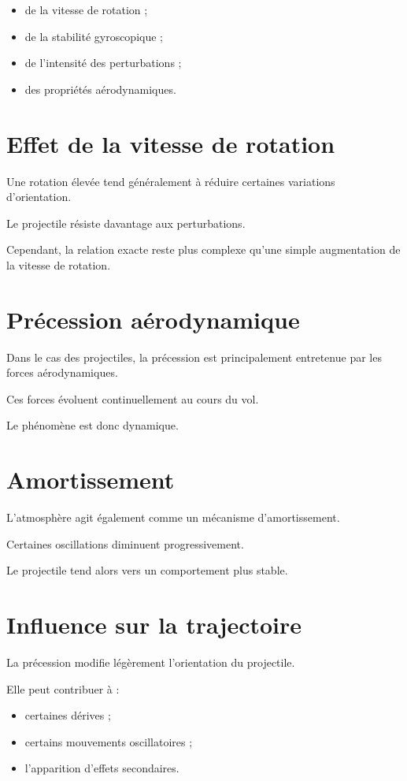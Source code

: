 \begin{itemize}
    \item de la vitesse de rotation ;
    \item de la stabilité gyroscopique ;
    \item de l'intensité des perturbations ;
    \item des propriétés aérodynamiques.
\end{itemize}

\section{Effet de la vitesse de rotation}

Une rotation élevée tend généralement à réduire certaines variations
d'orientation.

Le projectile résiste davantage aux perturbations.

Cependant, la relation exacte reste plus complexe qu'une simple augmentation
de la vitesse de rotation.

\section{Précession aérodynamique}

Dans le cas des projectiles, la précession est principalement entretenue par
les forces aérodynamiques.

Ces forces évoluent continuellement au cours du vol.

Le phénomène est donc dynamique.

\section{Amortissement}

L'atmosphère agit également comme un mécanisme d'amortissement.

Certaines oscillations diminuent progressivement.

Le projectile tend alors vers un comportement plus stable.

\section{Influence sur la trajectoire}

La précession modifie légèrement l'orientation du projectile.

Elle peut contribuer à :

\begin{itemize}
    \item certaines dérives ;
    \item certains mouvements oscillatoires ;
    \item l'apparition d'effets secondaires.
\end{itemize}

